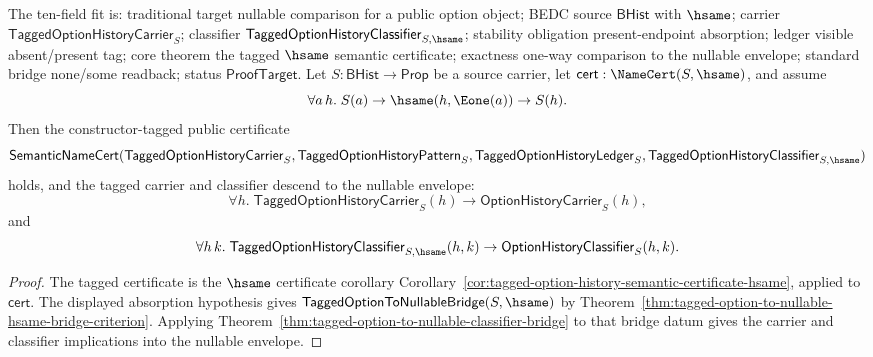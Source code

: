 \begin{theorem}
\label{thm:tagged-option-hsame-public-certificate-descends-to-nullable-envelope}
The ten-field fit is: traditional target nullable comparison for a public
option object; BEDC source $\mathsf{BHist}$ with $\hsame$; carrier
$\mathsf{TaggedOptionHistoryCarrier}_S$; classifier
$\mathsf{TaggedOptionHistoryClassifier}_{S,\hsame}$; stability obligation
present-endpoint absorption; ledger visible absent/present tag; core theorem the
tagged $\hsame$ semantic certificate; exactness one-way comparison to the
nullable envelope; standard bridge none/some readback; status
$\mathsf{ProofTarget}$. Let $S:\mathsf{BHist}\to\mathsf{Prop}$ be a source
carrier, let $\mathsf{cert}:\NameCert(S,\hsame)$, and assume
$$
\forall a\,h.\;
S(a)\to\hsame(h,\Eone(a))\to S(h).
$$
Then the constructor-tagged public certificate
$$
\mathsf{SemanticNameCert}(\mathsf{TaggedOptionHistoryCarrier}_S,
\mathsf{TaggedOptionHistoryPattern}_S,
\mathsf{TaggedOptionHistoryLedger}_S,
\mathsf{TaggedOptionHistoryClassifier}_{S,\hsame})
$$
holds, and the tagged carrier and classifier descend to the nullable envelope:
$$
\forall h.\;
\mathsf{TaggedOptionHistoryCarrier}_S(h)\to
\mathsf{OptionHistoryCarrier}_S(h),
$$
and
$$
\forall h\,k.\;
\mathsf{TaggedOptionHistoryClassifier}_{S,\hsame}(h,k)\to
\mathsf{OptionHistoryClassifier}_S(h,k).
$$
\end{theorem}
\begin{proof}
The tagged certificate is the $\hsame$ certificate corollary
Corollary~\ref{cor:tagged-option-history-semantic-certificate-hsame}, applied to
$\mathsf{cert}$. The displayed absorption hypothesis gives
$\mathsf{TaggedOptionToNullableBridge}(S,\hsame)$ by
Theorem~\ref{thm:tagged-option-to-nullable-hsame-bridge-criterion}. Applying
Theorem~\ref{thm:tagged-option-to-nullable-classifier-bridge} to that bridge
datum gives the carrier and classifier implications into the nullable envelope.
\end{proof}

